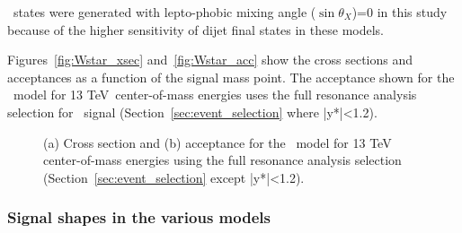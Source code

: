 \Wstar\ states were generated with lepto-phobic mixing angle ($\sin \theta_X$)=0 in this study because of the higher sensitivity of dijet final states in these models.


Figures~\ref{fig:Wstar_xsec} and~\ref{fig:Wstar_acc} show the cross sections and
acceptances as a function of the signal mass point.  
The acceptance shown for the \Wstar\ model for 13 TeV~center-of-mass energies 
uses the full resonance analysis selection for \Wstar\ signal (Section~\ref{sec:event_selection} where |y*|<1.2).

\begin{figure}[!htb]
  \centering
	\caption{(a) Cross section and (b) acceptance for the 
		\Wstar\ model for 13 TeV center-of-mass energies using the full resonance analysis selection (Section~\ref{sec:event_selection} except |y*|<1.2).
        }
\end{figure}


\clearpage

\subsubsection{Signal shapes in the various models}

